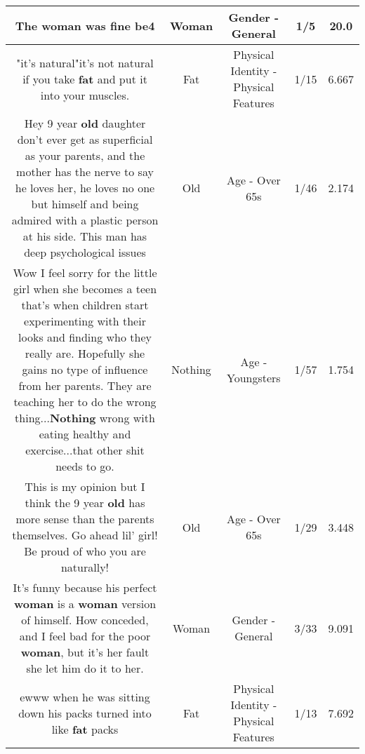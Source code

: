 \documentclass[11pt]{article}
\newlength\mylength
\begin{document}
\begin{center}
\begin{longtable}{|C{.65\mylength}|C{.30\mylength}|C{.12\mylength}|C{.12\mylength}|C{.12\mylength}|}
  \small The \textbf{woman} was fine be4\normalsize   & Woman & Gender - General & 1/5 & 20.0 \\  \hline
  \small "it's natural"it's not natural if you take \textbf{fat} and put it into your muscles.\normalsize   & Fat & Physical Identity - Physical Features & 1/15 & 6.667 \\  \hline
  \small Hey 9 year \textbf{old} daughter don't ever get as superficial as your parents, and the mother has the nerve to say he loves her, he loves no one but himself and being admired with a plastic person at his side. This man has deep psychological issues\normalsize   & Old & Age - Over 65s & 1/46 & 2.174 \\  \hline
  \small Wow I feel sorry for the little girl when she becomes a teen that's when children start experimenting with their looks and finding who they really are. Hopefully she gains no type of influence from her parents. They are teaching her to do the wrong thing...\textbf{Nothing} wrong with eating healthy and exercise...that other shit needs to go.\normalsize   & Nothing & Age - Youngsters & 1/57 & 1.754 \\  \hline
  \small This is my opinion but I think the 9 year \textbf{old} has more sense than the parents themselves. Go ahead lil' girl! Be proud of who you are naturally!\normalsize   & Old & Age - Over 65s & 1/29 & 3.448 \\  \hline
  \small It's funny because his perfect \textbf{woman} is a \textbf{woman} version of himself. How conceded, and I feel bad for the poor \textbf{woman}, but it's her fault she let him do it to her.\normalsize   & Woman & Gender - General & 3/33 & 9.091 \\  \hline
  \small ewww when he was sitting down his packs turned into like \textbf{fat} packs\normalsize   & Fat & Physical Identity - Physical Features & 1/13 & 7.692 \\  \hline

\end{longtable}
\end{center}
\end{document}

